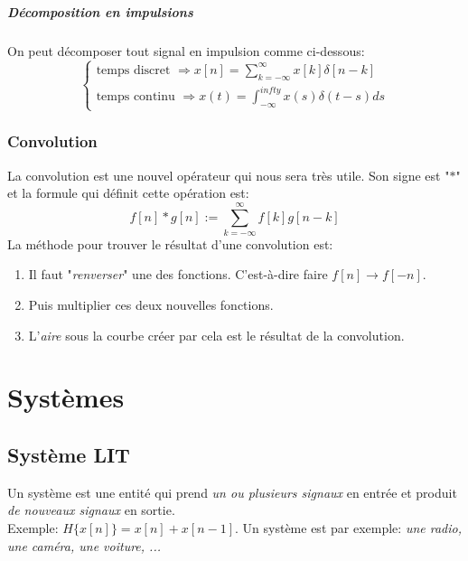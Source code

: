 \documentclass{report}
\begin{document}
\subsubsection{Décomposition en impulsions}
On peut décomposer tout signal en impulsion comme ci-dessous:
\begin{equation}
\begin{cases}
\text{temps discret } \Rightarrow x[n] = \sum_{k=-\infty}^{\infty}x[k]\delta[n-k] \\
\text{temps continu } \Rightarrow x(t) = \int_{-\infty}^{infty} x(s) \delta(t-s)ds
\end{cases}
\end{equation}



\section{Convolution} \label{convo}
La convolution est une nouvel opérateur qui nous sera très utile. Son signe est "$\ast$" et la formule qui définit cette opération est:
\begin{equation}
f[n] \ast g[n] := \sum_{k=-\infty}^{\infty} f[k]g[n-k] 
\end{equation}
La méthode pour trouver le résultat d'une convolution est:
\begin{enumerate}
\item Il faut "\textit{renverser}" une des fonctions. C'est-à-dire faire $f[n] \rightarrow f[-n]$.
\item Puis multiplier ces deux nouvelles fonctions.
\item L'\textit{aire} sous la courbe créer par cela est le résultat de la convolution.
\end{enumerate}


\part{Systèmes}

\chapter{Système LIT}
Un système est une entité qui prend \textit{un ou plusieurs signaux} en entrée et produit \textit{de nouveaux signaux} en sortie.\\
Exemple: $H\{x[n]\} = x[n] + x[n-1]$. Un système est par exemple: \textit{une radio, une caméra, une voiture, ...}
\end{document}
